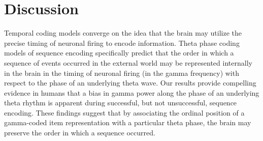 \section{Discussion}\label{discussion}

Temporal coding models \autocite{harris_neural_2005} converge on the
idea that the brain may utilize the precise timing of neuronal firing to
encode information. Theta phase coding models
\autocites{lisman_storage_1995}{lisman_-_2013}{lisman_neural_2008}{hasselmo_proposed_2002}{huxter_independent_2003}{tsodyks_population_1996}{dragoi_temporal_2006}
of sequence encoding specifically predict that the order in which a
sequence of events occurred in the external world may be represented
internally in the brain in the timing of neuronal firing (in the gamma
frequency) with respect to the phase of an underlying theta wave. Our
results provide compelling evidence in humans that a bias in gamma power
along the phase of an underlying theta rhythm is apparent during
successful, but not unsuccessful, sequence encoding. These findings
suggest that by associating the ordinal position of a gamma-coded item
representation with a particular theta phase, the brain may preserve the
order in which a sequence occurred.

